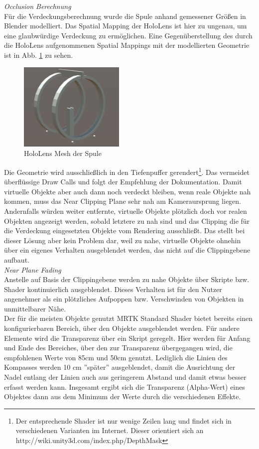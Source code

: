\textit{Occlusion Berechnung}\\
Für die Verdeckungsberechnung wurde die Spule anhand gemessener Größen in Blender modelliert. Das Spatial Mapping der HoloLens ist hier zu ungenau, um eine glaubwürdige Verdeckung zu ermöglichen. Eine Gegenüberstellung des durch die HoloLens aufgenommenen Spatial Mappings mit der modellierten Geometrie ist in Abb. \ref{img:mesh-vs-model} zu sehen.
\begin{figure}[H]
	\centering
	\includegraphics[width=0.45\textwidth]{images/model.jpg}
	\caption{HoloLens Mesh der Spule}
	\label{img:mesh-vs-model}
\end{figure}
Die Geometrie wird ausschließlich in den Tiefenpuffer gerendert\footnote{Der entsprechende Shader ist nur wenige Zeilen lang und findet sich in verschiedenen Varianten im Internet. Dieser orientiert sich an http://wiki.unity3d.com/index.php/DepthMask}. Das vermeidet überflüssige Draw Calls und folgt der Empfehlung der Dokumentation. Damit virtuelle Objekte aber auch dann noch verdeckt bleiben, wenn reale Objekte nah kommen, muss das Near Clipping Plane sehr nah am Kameraursprung liegen. Andernfalls würden weiter entfernte, virtuelle Objekte plötzlich doch vor realen Objekten angezeigt werden, sobald letztere zu nah sind und das Clipping die für die Verdeckung eingesetzten Objekte vom Rendering ausschließt. Das stellt bei dieser Lösung aber kein Problem dar, weil zu nahe, virtuelle Objekte ohnehin über ein eigenes Verhalten ausgeblendet werden, das nicht auf die Clippingebene aufbaut.\\


\textit{Near Plane Fading}\\
Anstelle auf Basis der Clippingebene werden zu nahe Objekte über Skripte bzw. Shader kontinuierlich ausgeblendet. Dieses Verhalten ist für den Nutzer angenehmer als ein plötzliches Aufpoppen bzw. Verschwinden von Objekten in unmittelbarer Nähe.\\

Der für die meisten Objekte genutzt MRTK Standard Shader bietet bereits einen konfigurierbaren Bereich, über den Objekte ausgeblendet werden. Für andere Elemente wird die Transparenz über ein Skript geregelt. Hier werden für Anfang und Ende des Bereiches, über den zur Transparenz übergegangen wird, die empfohlenen Werte von 85cm und 50cm genutzt. Lediglich die Linien des Kompasses werden 10 cm ''später'' ausgeblendet, damit die Ausrichtung der Nadel entlang der Linien auch aus geringerem Abstand und damit etwas besser erfasst werden kann. Insgesamt ergibt sich die Transparenz (Alpha-Wert) eines Objektes dann aus dem Minimum der Werte durch die verschiedenen Effekte.\\

